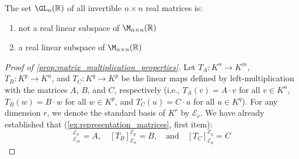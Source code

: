 \begin{exercise}
\label{exc:gl_not_subspace_sc}
The set $\GL_n(\mathbb{R})$ of all invertible $n \times n$ real matrices is:
\begin{enumerate}
    \item not a real linear subspace of $\M_{n \times n}(\mathbb{R})$
    \item a real linear subspace of $\M_{n \times n}(\mathbb{R})$
\end{enumerate}
\end{exercise}

\begin{proof}[Proof of \cref{prop:matrix_multiplication_properties}]
Let $T_A: K^n \to K^m$, $T_B: K^p \to K^n$, and $T_C: K^q \to K^p$ be the linear maps defined by left-multiplication with the matrices $A$, $B$, and $C$, respectively (i.e., $T_A(v) = A \cdot v$ for all $v \in K^n$, $T_B(w) = B \cdot w$ for all $w \in K^p$, and $T_C(u) = C \cdot u$ for all $u \in K^q$). For any dimension $r$, we denote the standard basis of $K^r$ by $\mathcal{E}_r$. We have already established that (\cref{ex:representation_matrices}, first item):
\begin{equation*}
    [T_A]_{\mathcal{E}_m}^{\mathcal{E}_n} = A, \quad [T_B]_{\mathcal{E}_n}^{\mathcal{E}_p} = B, \quad \text{and} \quad [T_C]_{\mathcal{E}_p}^{\mathcal{E}_q} = C
\end{equation*}


\end{proof}
